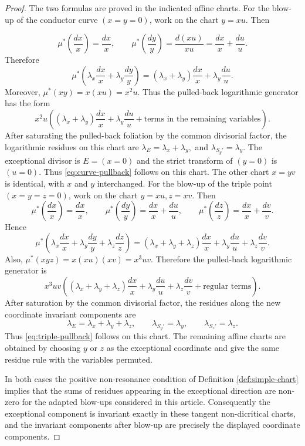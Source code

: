 \documentclass[11pt]{amsart}
\numberwithin{equation}{section}
\theoremstyle{plain}
\theoremstyle{definition}
\begin{document}
\begin{proof}
The two formulas are proved in the indicated affine charts.
For the blow-up of the conductor curve $(x=y=0)$, work on the chart
$y=xu$. Then

\[
\mu^*\left(\frac{dx}{x}\right)=\frac{dx}{x},
\qquad
\mu^*\left(\frac{dy}{y}\right)
=
\frac{d(xu)}{xu}
=
\frac{dx}{x}+\frac{du}{u}.
\]
Therefore
\[
\mu^*\left(
\lambda_x\frac{dx}{x}+\lambda_y\frac{dy}{y}
\right)
=
(\lambda_x+\lambda_y)\frac{dx}{x}
+
\lambda_y\frac{du}{u}.
\]
Moreover,
$
\mu^*(xy)=x(xu)=x^2u.
$
Thus the pulled-back logarithmic generator has the form
\[
x^2u\left(
(\lambda_x+\lambda_y)\frac{dx}{x}
+
\lambda_y\frac{du}{u}
+
\text{terms in the remaining variables}
\right).
\]
After saturating the pulled-back foliation by the common divisorial factor,
the logarithmic residues on this chart are
$
\lambda_E=\lambda_x+\lambda_y,
 $ and $
\lambda_{S_y'}=\lambda_y.
$
The exceptional divisor is $E=(x=0)$ and the strict transform of $(y=0)$ is
$(u=0)$. Thus \eqref{eq:curve-pullback} follows on this chart. The other
chart $x=yv$ is identical, with $x$ and $y$ interchanged.
For the blow-up of the triple point $(x=y=z=0)$, work on the chart
$
y=xu, z=xv.
$
Then
\[
\mu^*\left(\frac{dx}{x}\right)=\frac{dx}{x},
\qquad
\mu^*\left(\frac{dy}{y}\right)=\frac{dx}{x}+\frac{du}{u},
\qquad
\mu^*\left(\frac{dz}{z}\right)=\frac{dx}{x}+\frac{dv}{v}.
\]
Hence
\[
\mu^*\left(
\lambda_x\frac{dx}{x}
+\lambda_y\frac{dy}{y}
+\lambda_z\frac{dz}{z}
\right)
=
(\lambda_x+\lambda_y+\lambda_z)\frac{dx}{x}
+
\lambda_y\frac{du}{u}
+
\lambda_z\frac{dv}{v}.
\]
Also,
$
\mu^*(xyz)=x(xu)(xv)=x^3uv.
$
Therefore the pulled-back logarithmic generator is
\[
x^3uv\left(
(\lambda_x+\lambda_y+\lambda_z)\frac{dx}{x}
+
\lambda_y\frac{du}{u}
+
\lambda_z\frac{dv}{v}
+
\text{regular terms}
\right).
\]
After saturation by the common divisorial factor, the residues along the new
coordinate invariant components are
\[
\lambda_E=\lambda_x+\lambda_y+\lambda_z,
\qquad
\lambda_{S_y'}=\lambda_y,
\qquad
\lambda_{S_z'}=\lambda_z.
\]
Thus \eqref{eq:triple-pullback} follows on this chart. The remaining affine
charts are obtained by choosing $y$ or $z$ as the exceptional coordinate and
give the same residue rule with the variables permuted.

In both cases the positive non-resonance condition of Definition
\ref{def:simple-chart} implies that the sums of residues appearing in the
exceptional direction are non-zero for the adapted blow-ups considered in this article.
Consequently the exceptional component is invariant exactly in these
tangent non-dicritical charts, and the invariant components after blow-up
are precisely the displayed coordinate components.
\end{proof}
\end{document}
